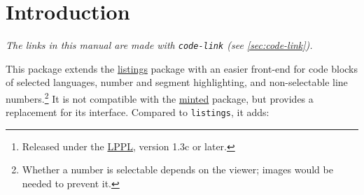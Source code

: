 \documentclass[a4paper,10pt,parskip=half,numbers=noenddot]{scrartcl}
\title{\T{xlistings}}
\subtitle{\url{https://github.com/EagleoutIce/xlistings}}
\author{Florian Sihler\thanks{Released under the \href{https://www.latex-project.org/lppl.txt}{LPPL}, version 1.3c or later.}}
\date{Version \xlstdocversion{} \textendash{} \xlstdocdate}
\let\T\texttt
\begin{document}
\maketitle
\thispagestyle{empty}
\tableofcontents


\section{Introduction}

\noindent\textit{The links in this manual are made with \T{code-link} (see \cref{sec:code-link}).}

This package extends the \href{https://ctan.org/pkg/listings}{listings} package with an easier front-end for code blocks of selected languages, number and segment highlighting, and non-selectable line numbers.\footnote{Whether a number is selectable depends on the viewer; images would be needed to prevent it.} It is not compatible with the \href{https://ctan.org/pkg/minted}{minted} package, but provides a replacement for its interface. Compared to \T{listings}, it adds:
\end{document}
